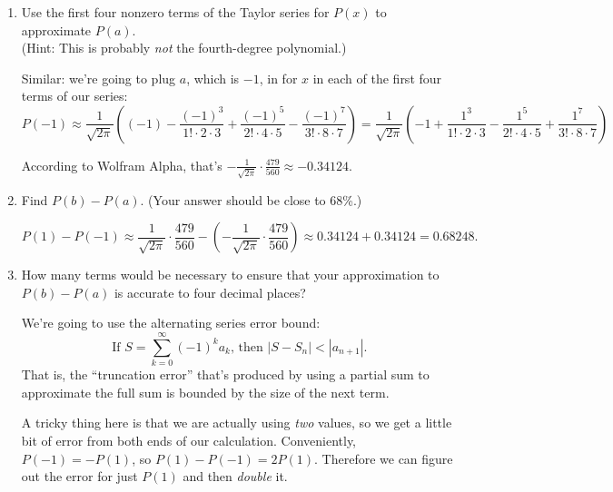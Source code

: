 \documentclass[10pt]{article}
\newenvironment{red}{\color{red}}{\ignorespacesafterend}
\begin{document}
\begin{enumerate}[leftmargin=0pt]
\begin{red}
    (Notice, btw, that this is indeed \textit{not} the fourth-degree polynomial -- it's the 7th-degree polynomial. This is actually good because higher powers of $x$ are probably going to give us better approximations, so it's nice when they come earlier in the series than we would otherwise think.)
    \end{red}
    \item Use the first four nonzero terms of the Taylor series for $P(x)$ to approximate $P(a)$. \\
    (Hint: This is probably \textit{not} the fourth-degree polynomial.)
    
    \begin{red}
    Similar: we're going to plug $a$, which is $-1$, in for $x$ in each of the first four terms of our series:
    \[P(-1) \approx \frac{1}{\sqrt{2\pi}} \left((-1) - \frac{(-1)^3}{1! \cdot 2\cdot 3} + \frac{(-1)^5}{2!\cdot 4\cdot 5} - \frac{(-1)^7}{3!\cdot 8 \cdot 7} \right) = \frac{1}{\sqrt{2\pi}} \left(-1 + \frac{1^3}{1! \cdot 2\cdot 3} - \frac{1^5}{2!\cdot 4\cdot 5} + \frac{1^7}{3!\cdot 8 \cdot 7}\right) \]
    
    According to Wolfram Alpha, that's $-\frac{1}{\sqrt{2\pi}}\cdot  \frac{479}{560} \approx -0.34124$.
    \end{red}
    \item Find $P(b) - P(a)$. (Your answer should be close to 68\%.)
    
    \begin{red}
    \[P(1) - P(-1) \approx \frac{1}{\sqrt{2\pi}}\cdot  \frac{479}{560} - \left( - \frac{1}{\sqrt{2\pi}}\cdot  \frac{479}{560}\right) \approx 0.34124 + 0.34124 = 0.68248.\]
    \end{red}
    \item How many terms would be necessary to ensure that your approximation to $P(b)-P(a)$ is accurate to four decimal places? 
    
    \begin{red}
    We're going to use the alternating series error bound:
    \[\text{If } S = \sum_{k=0}^\infty (-1)^k a_k\text {, then }|S-S_n| < |a_{n+1}|.\]
    That is, the ``truncation error'' that's produced by using a partial sum to approximate the full sum is bounded by the size of the next term.

    A tricky thing here is that we are actually using \textit{two} values, so we get a little bit of error from both ends of our calculation. Conveniently, $P(-1) = -P(1)$, so $P(1) - P(-1) = 2P(1)$. Therefore we can figure out the error for just $P(1)$ and then \textit{double} it.
    

\end{red}
\end{enumerate}
\end{document}
